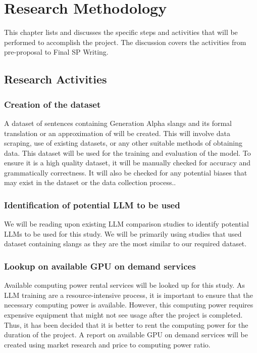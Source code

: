 \chapter{Research Methodology}
This chapter lists and discusses the specific steps and activities that will be performed  to accomplish the project. 
The discussion covers the activities from pre-proposal to Final SP Writing.

\section{Research Activities}
\subsection{Creation of the dataset} 
A dataset of sentences containing Generation Alpha slangs and its formal translation or an approximation of will be created.
This will involve data scraping, use of existing datasets, or any other suitable methods of obtaining data.
This dataset will be used for the training and evaluation of the model.
To ensure it is a high quality dataset, it will be manually checked for accuracy and grammatically correctness.
It will also be checked for any potential biases that may exist in the dataset or the data collection process..

\subsection{Identification of potential LLM to be used}
We will be reading upon existing LLM comparison studies to identify potential LLMs to be used for this study.
We will be primarily using studies that used dataset containing slangs as they are the most similar to our required dataset.

\subsection{Lookup on available GPU on demand services} 
Available computing power rental services will be looked up for this study.
As LLM training are a resource-intensive process, it is important to ensure that the necessary computing power is available.
However, this computing power requires expensive equipment that might not see usage after the project is completed.
Thus, it has been decided that it is better to rent the computing power for the duration of the project.
A report on available GPU on demand services will be created using market research and price to computing power ratio.

